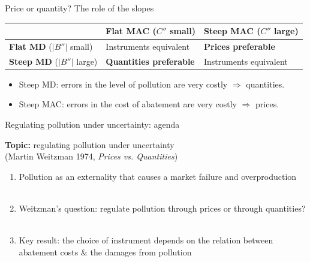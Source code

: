 \documentclass{beamer}
\begin{document}
\begin{frame}[label=w7_table]{Price or quantity? The role of the slopes}

\centering
\renewcommand{\arraystretch}{1.8}
\begin{tabular}{>{\centering\arraybackslash}m{3cm}|>{\centering\arraybackslash}m{3.5cm}|>{\centering\arraybackslash}m{3.5cm}}
\toprule
 & \textbf{Flat MAC} \newline \small{($C''$ small)} & \textbf{Steep MAC} \newline \small{($C''$ large)} \\
\midrule
\textbf{Flat MD} \newline \small{($|B''|$ small)}
& \cellcolor{gray!20} Instruments equivalent
& \cellcolor{green!25} \textbf{Prices preferable} \\
\midrule
\textbf{Steep MD} \newline \small{($|B''|$ large)}
& \cellcolor{yellow!35} \textbf{Quantities preferable}
& \cellcolor{gray!20} Instruments equivalent \\
\bottomrule
\end{tabular}

\vspace{0.5cm}

\begin{itemize}
  \item Steep MD: errors in the level of pollution are very costly $\Rightarrow$ quantities.
  \item Steep MAC: errors in the cost of abatement are very costly $\Rightarrow$ prices.
\end{itemize}

\end{frame}


\begin{frame}[label=w7_agenda]{Regulating pollution under uncertainty: agenda}

\textbf{Topic:} regulating pollution under uncertainty \\ (Martin Weitzman 1974, \textit{Prices vs. Quantities})

\begin{enumerate}
    \item Pollution as an externality that causes a market failure and overproduction \\~\\
    \item Weitzman's question: regulate pollution through prices or through quantities? \\~\\
    \item Key result: the choice of instrument depends on the relation between abatement costs \& the damages from pollution
\end{enumerate}

\end{frame}
\end{document}
